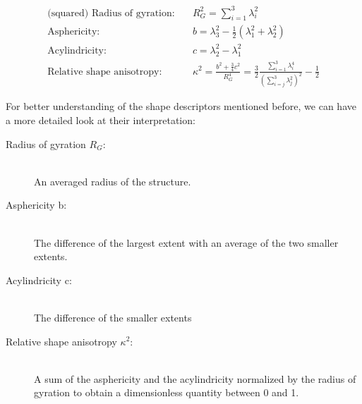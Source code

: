 \begin{align}
\label{eqn:tog_quantities1}
\text{(squared) Radius of gyration:} \quad &R_G^2 = \sum_{i=1}^3 \lambda_i^2\\
\label{eqn:tog_quantities2}
\text{Asphericity:} \quad &b = \lambda_3^2 - \frac{1}{2}(\lambda_1^2+\lambda_2^2)\\
\label{eqn:tog_quantities3}
\text{Acylindricity:} \quad &c = \lambda_2^2 - \lambda_1^2\\
\label{eqn:tog_quantities4}
\text{Relative shape anisotropy:} \quad &\kappa^2 = \frac{b^2 + \frac{3}{4} c^2 }{R_G^4} =  \frac{3}{2} \frac{ \sum_{i=1}^3 \lambda_i^4 }{\left(\sum_{i=j}^3 \lambda_j^2 \right) ^2 } - \frac{1}{2}
\end{align}

For better understanding of the shape descriptors mentioned before, we can have a more detailed look at their interpretation:

\begin{description}
\item[Radius of gyration $R_G$:] \hfill \\ An averaged radius of the structure.
\item[Asphericity b:]\hfill \\ The difference of the largest extent with an average of the two smaller extents. 
\item[Acylindricity c:] \hfill \\ The difference of the smaller extents
\item[Relative shape anisotropy $\kappa^2$:] \hfill \\ A sum of the asphericity and the acylindricity normalized by the radius of gyration to obtain a dimensionless quantity between 0 and 1.
\end{description}

